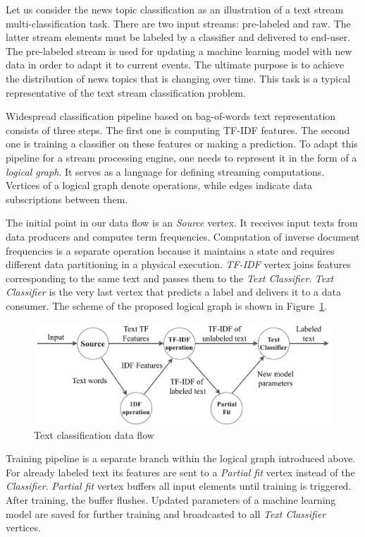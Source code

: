 \label{fs-framework}

Let us consider the news topic classification as an illustration of a text stream multi-classification task. There are two input streams: pre-labeled and raw. The latter stream elements must be labeled by a classifier and delivered to end-user. The pre-labeled stream is used for updating a machine learning model with new data in order to adapt it to current events. The ultimate purpose is to achieve the distribution of news topics that is changing over time. This task is a typical representative of the text stream classification problem.

Widespread classification pipeline based on bag-of-words text representation consists of three steps. The first one is computing TF-IDF features. The second one is training a classifier on these features or making a prediction. To adapt this pipeline for a stream processing engine, one needs to represent it in the form of a {\em logical graph}. It serves as a language for defining streaming computations. Vertices of a logical graph denote operations, while edges indicate data subscriptions between them. 

The initial point in our data flow is an {\em Source} vertex. It receives input texts from data producers and computes term frequencies. Computation of inverse document frequencies is a separate operation because it maintains a state and requires different data partitioning in a physical execution. {\em TF-IDF} vertex joins features corresponding to the same text and passes them to the {\em Text Classifier}. {\em Text Classifier} is the very last vertex that predicts a label and delivers it to a data consumer. The scheme of the proposed logical graph is shown in Figure~\ref{logical_graph}.

\begin{figure}[htbp]
  \centering
  \includegraphics[scale=0.38]{pics/logical-graph}
  \caption{Text classification data flow}
  \label {logical_graph}
\end{figure}

Training pipeline is a separate branch within the logical graph introduced above. For already labeled text its features are sent to a {\em Partial fit} vertex instead of the {\em Classifier}. {\em Partial fit} vertex buffers all input elements until training is triggered. After training, the buffer flushes. Updated parameters of a machine learning model are saved for further training and broadcasted to all {\em Text Classifier} vertices.

